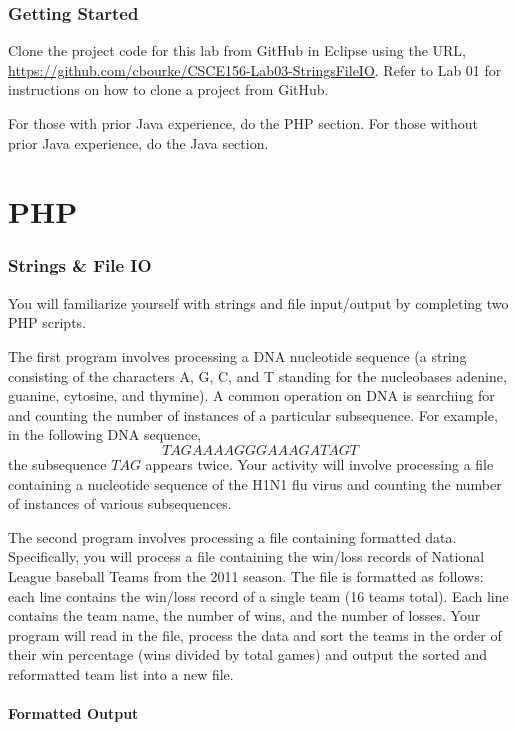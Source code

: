 \documentclass[12pt]{scrartcl}
\begin{document}


\section*{Getting Started}

Clone the project code for this lab from GitHub in Eclipse using the
URL, \url{https://github.com/cbourke/CSCE156-Lab03-StringsFileIO}.
Refer to Lab 01 for instructions on how to clone a project from GitHub.

For those with prior Java experience, do the PHP section.  For those
without prior Java experience, do the Java section.

\part*{PHP}

\section*{Strings \& File IO}

You will familiarize yourself with strings and file input/output 
by completing two PHP scripts.  

The first program involves processing a DNA nucleotide sequence (a 
string consisting of the characters A, G, C, and T standing for the 
nucleobases adenine, guanine, cytosine, and thymine).  A common 
operation on DNA is searching for and counting the number of instances 
of a particular subsequence.  For example, in the following DNA 
sequence, 
$$TAGAAAAGGGAAAGATAGT$$
the subsequence $TAG$ appears twice.  Your activity will involve 
processing a file containing a nucleotide sequence of the H1N1 flu 
virus and counting the number of instances of various subsequences.

The second program involves processing a file containing formatted 
data.  Specifically, you will process a file containing the win/loss 
records of National League baseball Teams from the 2011 season.  The 
file is formatted as follows: each line contains the win/loss record 
of a single team (16 teams total).  Each line contains the team name, 
the number of wins, and the number of losses.  Your program will read 
in the file, process the data and sort the teams in the order of their 
win percentage (wins divided by total games) and output the sorted and 
reformatted team list into a new file.

\subsection*{Formatted Output}
\end{document}
